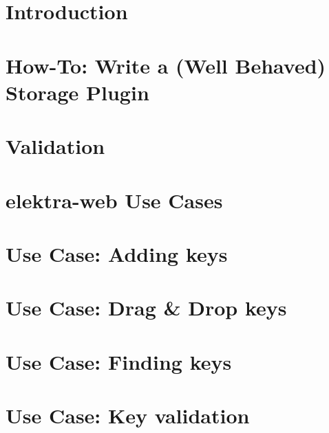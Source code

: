 \documentclass[twoside]{book}
\newcommand{\+}{\discretionary{\mbox{\scriptsize$\hookleftarrow$}}{}{}}
\begin{document}
\chapter{Introduction}
\label{doc_tutorials_run_reformatting_script_with_docker_md}

\chapter{How-\/\+To\+: Write a (Well Behaved) Storage Plugin}
\label{doc_tutorials_storage-plugins_md}

\chapter{Validation}
\label{doc_tutorials_validation_md}

\chapter{elektra-\/web Use Cases}
\label{doc_usecases_elektra_web_README_md}

\chapter{Use Case\+: Adding keys}
\label{doc_usecases_elektra_web_UC_adding_keys_md}

\chapter{Use Case\+: Drag \& Drop keys}
\label{doc_usecases_elektra_web_UC_drag_n_drop_md}

\chapter{Use Case\+: Finding keys}
\label{doc_usecases_elektra_web_UC_finding_keys_md}

\chapter{Use Case\+: Key validation}
\label{doc_usecases_elektra_web_UC_key_validation_md}

\end{document}
